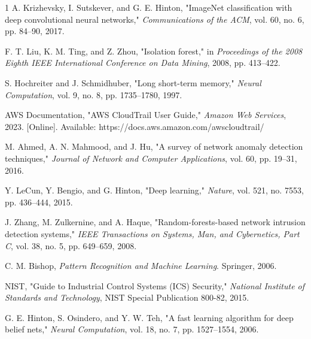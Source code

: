 \documentclass[conference]{IEEEtran}
\begin{document}
\begin{thebibliography}{1}
A. Krizhevsky, I. Sutskever, and G. E. Hinton, "ImageNet classification with deep convolutional neural networks," \emph{Communications of the ACM}, vol. 60, no. 6, pp. 84--90, 2017.

F. T. Liu, K. M. Ting, and Z. Zhou, "Isolation forest," in \emph{Proceedings of the 2008 Eighth IEEE International Conference on Data Mining}, 2008, pp. 413--422.

S. Hochreiter and J. Schmidhuber, "Long short-term memory," \emph{Neural Computation}, vol. 9, no. 8, pp. 1735--1780, 1997.

AWS Documentation, "AWS CloudTrail User Guide," \emph{Amazon Web Services}, 2023. [Online]. Available: https://docs.aws.amazon.com/awscloudtrail/

M. Ahmed, A. N. Mahmood, and J. Hu, "A survey of network anomaly detection techniques," \emph{Journal of Network and Computer Applications}, vol. 60, pp. 19--31, 2016.

Y. LeCun, Y. Bengio, and G. Hinton, "Deep learning," \emph{Nature}, vol. 521, no. 7553, pp. 436--444, 2015.

J. Zhang, M. Zulkernine, and A. Haque, "Random-forests-based network intrusion detection systems," \emph{IEEE Transactions on Systems, Man, and Cybernetics, Part C}, vol. 38, no. 5, pp. 649--659, 2008.

C. M. Bishop, \emph{Pattern Recognition and Machine Learning}. Springer, 2006.

NIST, "Guide to Industrial Control Systems (ICS) Security," \emph{National Institute of Standards and Technology}, NIST Special Publication 800-82, 2015.

G. E. Hinton, S. Osindero, and Y. W. Teh, "A fast learning algorithm for deep belief nets," \emph{Neural Computation}, vol. 18, no. 7, pp. 1527--1554, 2006.

\end{thebibliography}
\end{document}
